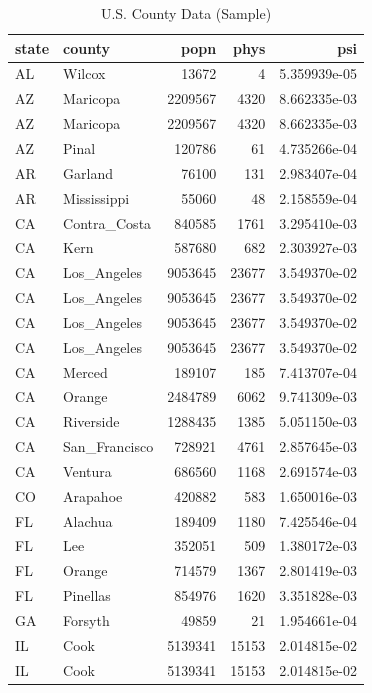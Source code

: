 \documentclass[
  letterpaper,
  DIV=11,
  numbers=noendperiod]{scrreprt}
\renewcommand{\[}{\begin{equation}}
\renewcommand{\]}{\end{equation}}
\begin{document}
\begin{table}
\caption*{
{\fontsize{20}{25}\selectfont  U.S. County Data (Sample)\fontsize{12}{15}\selectfont }
} 
\fontsize{12.0pt}{14.0pt}\selectfont
\begin{tabular*}{\linewidth}{@{\extracolsep{\fill}}llrrr}
\toprule
state & county & popn & phys & psi \\ 
\midrule\addlinespace[2.5pt]
AL & Wilcox & 13672 & 4 & 5.359939e-05 \\ 
AZ & Maricopa & 2209567 & 4320 & 8.662335e-03 \\ 
AZ & Maricopa & 2209567 & 4320 & 8.662335e-03 \\ 
AZ & Pinal & 120786 & 61 & 4.735266e-04 \\ 
AR & Garland & 76100 & 131 & 2.983407e-04 \\ 
AR & Mississippi & 55060 & 48 & 2.158559e-04 \\ 
CA & Contra\_Costa & 840585 & 1761 & 3.295410e-03 \\ 
CA & Kern & 587680 & 682 & 2.303927e-03 \\ 
CA & Los\_Angeles & 9053645 & 23677 & 3.549370e-02 \\ 
CA & Los\_Angeles & 9053645 & 23677 & 3.549370e-02 \\ 
CA & Los\_Angeles & 9053645 & 23677 & 3.549370e-02 \\ 
CA & Los\_Angeles & 9053645 & 23677 & 3.549370e-02 \\ 
CA & Merced & 189107 & 185 & 7.413707e-04 \\ 
CA & Orange & 2484789 & 6062 & 9.741309e-03 \\ 
CA & Riverside & 1288435 & 1385 & 5.051150e-03 \\ 
CA & San\_Francisco & 728921 & 4761 & 2.857645e-03 \\ 
CA & Ventura & 686560 & 1168 & 2.691574e-03 \\ 
CO & Arapahoe & 420882 & 583 & 1.650016e-03 \\ 
FL & Alachua & 189409 & 1180 & 7.425546e-04 \\ 
FL & Lee & 352051 & 509 & 1.380172e-03 \\ 
FL & Orange & 714579 & 1367 & 2.801419e-03 \\ 
FL & Pinellas & 854976 & 1620 & 3.351828e-03 \\ 
GA & Forsyth & 49859 & 21 & 1.954661e-04 \\ 
IL & Cook & 5139341 & 15153 & 2.014815e-02 \\ 
IL & Cook & 5139341 & 15153 & 2.014815e-02 \\ 

\end{tabular*}
\end{table}
\end{document}
